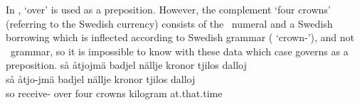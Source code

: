 In ,  ‘over’ is used as a preposition. %
However, the complement  ‘four crowns’ (referring to the Swedish currency) consists of the \PS\ numeral  and a Swedish borrowing  which is inflected according to Swedish grammar ( ‘crown-\PLs’), and not \PS\ grammar, so it is impossible to know with these data which case  governs as a preposition. 
\ea\label{prepositionEx2}%
\glll	så åtjojmä badjel nällje kronor tjilos dalloj\\
	så åtjo-jmä badjel nällje kronor tjilos dalloj\\
	so receive- over four crowns kilogram at.that.time\\\nopagebreak
{}	
\z

